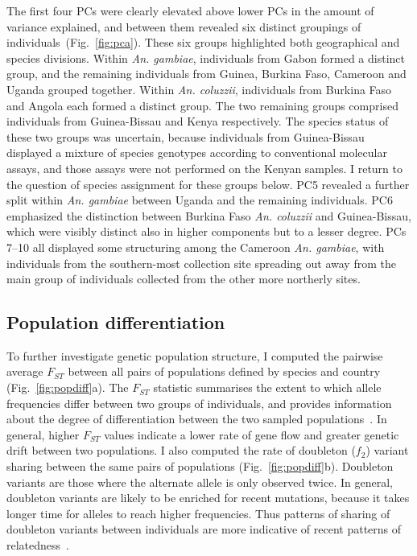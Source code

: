 \begin{refsection}
The first four PCs were clearly elevated above lower PCs in the amount of variance explained, and between them revealed six distinct groupings of individuals~(Fig.~\ref{fig:pca}).
%
These six groups highlighted both geographical and species divisions.
%
Within \textit{An. gambiae}, individuals from Gabon formed a distinct group, and the remaining individuals from Guinea, Burkina Faso, Cameroon and Uganda grouped together.
%
Within \textit{An. coluzzii}, individuals from Burkina Faso and Angola each formed a distinct group.
%
The two remaining groups comprised individuals from Guinea-Bissau and Kenya respectively.
%
The species status of these two groups was uncertain, because individuals from Guinea-Bissau displayed a mixture of species genotypes according to conventional molecular assays, and those assays were not performed on the Kenyan samples.
%
I return to the question of species assignment for these groups below.
%
PC5 revealed a further split within \textit{An. gambiae} between Uganda and the remaining individuals.
%
PC6 emphasized the distinction between Burkina Faso \textit{An. coluzzii} and Guinea-Bissau, which were visibly distinct also in higher components but to a lesser degree.
%
PCs 7--10 all displayed some structuring among the Cameroon \textit{An. gambiae}, with individuals from the southern-most collection site spreading out away from the main group of individuals collected from the other more northerly sites.


\subsection{Population differentiation}\label{subsec:pop-diff}


To further investigate genetic population structure, I computed the pairwise average $F_{ST}$ between all pairs of populations defined by species and country (Fig.~\ref{fig:popdiff}a).
%
The $F_{ST}$ statistic summarises the extent to which allele frequencies differ between two groups of individuals, and provides information about the degree of differentiation between the two sampled populations~\parencite{Rousset1997,Holsinger2009,Bhatia2013}.
%
In general, higher $F_{ST}$ values indicate a lower rate of gene flow and greater genetic drift between two populations.
%
I also computed the rate of doubleton ($f_{2}$) variant sharing between the same pairs of populations (Fig.~\ref{fig:popdiff}b).
%
Doubleton variants are those where the alternate allele is only observed twice.
%
In general, doubleton variants are likely to be enriched for recent mutations, because it takes longer time for alleles to reach higher frequencies.
%
Thus patterns of sharing of doubleton variants between individuals are more indicative of recent patterns of relatedness~\parencite{1000G2012}.



\end{refsection}
